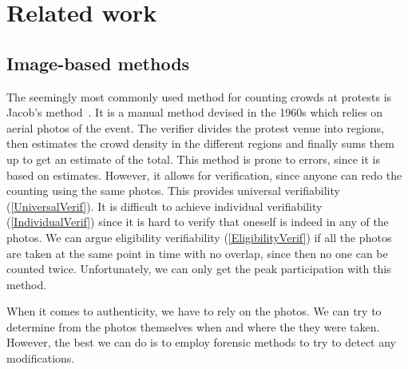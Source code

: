 \mode*
\section{Related work}

\subsection<presentation>{Image-based methods}

The seemingly most commonly used method for counting crowds at protests is 
Jacob's method~\cite[c.f.][]{%
  2016DemonstrationsInSeoul,%
  BBCHowToCountProtestNumbers,%
  HowWillWeKnowTrumpInauguralCrowdSize,%
  TheXManMarch,%
  TheCrowdNumbersGame,%
}.
It is a manual method devised in the 1960s which relies on aerial photos of the 
event.
The verifier divides the protest venue into regions, then estimates the crowd 
density in the different regions and finally sums them up to get an estimate of 
the total.
This method is prone to errors, since it is based on estimates.
However, it allows for verification, since anyone can redo the counting using 
the same photos.
This provides universal verifiability (\cref{UniversalVerif}).
It is difficult to achieve individual verifiability (\cref{IndividualVerif}) 
since it is hard to verify that oneself is indeed in any of the photos.
We can argue eligibility verifiability (\cref{EligibilityVerif}) if all the 
photos are taken at the same point in time with no overlap, since then no one 
can be counted twice.
Unfortunately, we can only get the peak participation with this method.

When it comes to authenticity, we have to rely on the photos.
We can try to determine from the photos themselves when and where the they were 
taken.
However, the best we can do is to employ forensic methods to try to detect any 
modifications.

